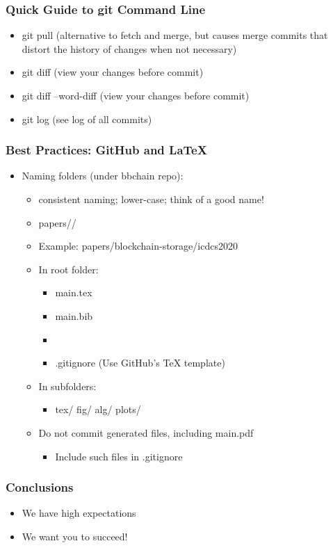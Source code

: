 \documentclass[hyperref={pdfpagelabels=false,linkcolor=blue}, aspectratio=1610]{beamer}
\begin{document}
\begin{frame}
\frametitle{Quick Guide to git Command Line}
\begin{block}{}
 \begin{itemize}
  \item git pull \quad (alternative to fetch and merge, but causes merge commits that distort the history of changes when not necessary)
  \item git diff \quad (view your changes before commit)
  \item git diff --word-diff \quad (view your changes before commit)
  \item git log \quad (see log of all commits)
 \end{itemize}
\end{block}
\end{frame}

\begin{frame}
\frametitle{Best Practices: GitHub and LaTeX}
\begin{block}{}
 \begin{itemize}
  \item Naming folders (under bbchain repo):
  \begin{itemize}
  	\item consistent naming; lower-case; think of a good name!
	\item papers//
	\item Example: papers/blockchain-storage/icdcs2020
  \end{itemize}
  \begin{itemize}
  	\item In root folder:
	\begin{itemize}
		\item main.tex
		\item main.bib
		\item {}
		\item .gitignore \quad (Use GitHub's TeX template)
	\end{itemize}
	\item In subfolders:
	\begin{itemize}
		\item tex/ \quad fig/ \quad alg/ \quad plots/
	\end{itemize}
	\item Do not commit generated files, including main.pdf
	\begin{itemize}
		\item Include such files in .gitignore
	\end{itemize}
  \end{itemize}
  \end{itemize}
\end{block}
\end{frame}

\begin{frame}
\frametitle{Conclusions}
\begin{block}{}
 \begin{itemize}
  \item We have high expectations
  \item We want you to succeed!
 \end{itemize}
\end{block}
\end{frame}
\end{document}
